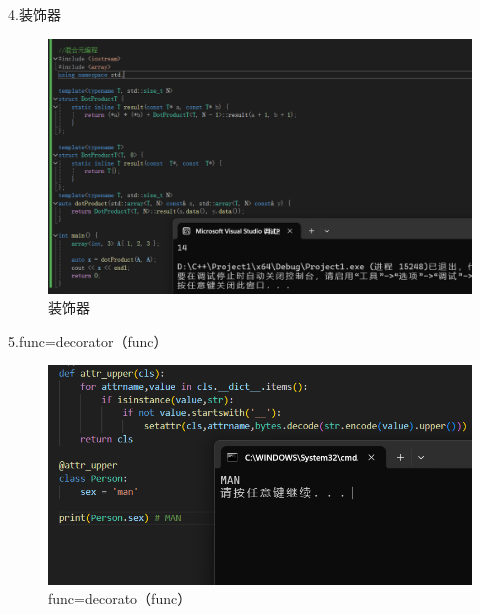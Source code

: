 \documentclass[a4paper, 12pt]{article}
\begin{document}
4.装饰器
\begin{figure}[H]
  \centering
  \includegraphics[width=\textwidth]{屏幕截图 2024-09-15 184654.png}
  \caption{ 装饰器}
\end{figure}

5.func=decorator（func）
\begin{figure}[H]
  \centering
  \includegraphics[width=\textwidth]{屏幕截图 2024-09-15 185701.png}
  \caption{ func=decorato（func）}
\end{figure}
\end{document}
